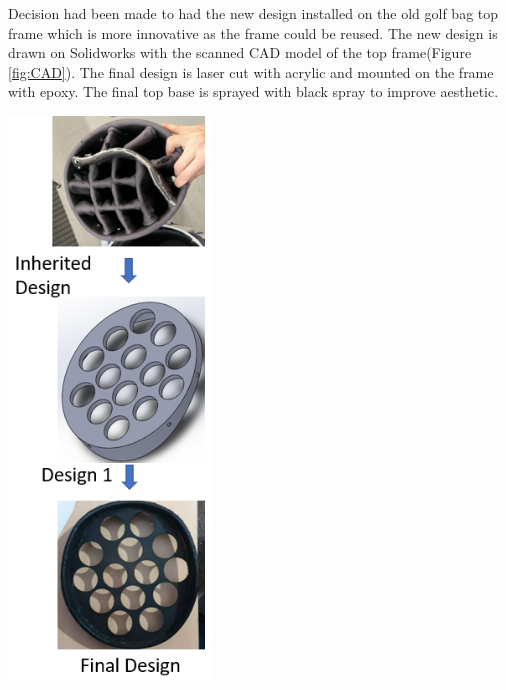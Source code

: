 \documentclass[11pt,landscape]{article}
\newenvironment{Figure}
  {\par\medskip\noindent\minipage{\linewidth}}
  {\endminipage\par\medskip}
\begin{document}
\begin{multicols}{3}
    Decision had been made to had the new design installed on the old golf bag
    top frame which is more innovative as the frame could be reused. The new
    design is drawn on Solidworks with the scanned CAD model of the top
    frame(Figure \ref{fig:CAD}). The final design is laser cut with acrylic and
    mounted on the frame with epoxy. The final top base is sprayed with black
    spray to improve aesthetic.
    \begin{Figure}
        \begin{center}
            \includegraphics[width=0.4\textwidth]{Figure.png}
            \label{fig:change}
        \end{center}
    \end{Figure}
    

\end{multicols}
\end{document}
